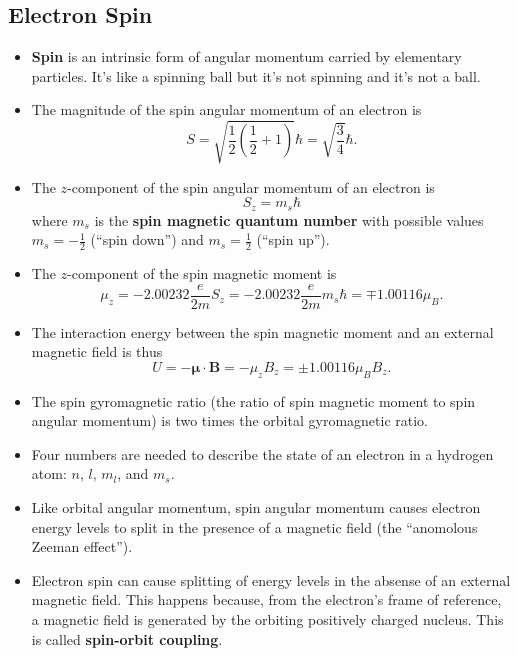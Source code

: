 \documentclass{article}
\begin{document}
\subsection{Electron Spin}

\begin{itemize}
  \item \textbf{Spin} is an intrinsic form of angular momentum carried by elementary particles. It's like a spinning ball but it's not spinning and it's not a ball.

  \item The magnitude of the spin angular momentum of an electron is \[S = \sqrt{\frac{1}{2} \left( \frac{1}{2} + 1 \right)} \hbar = \sqrt{\frac{3}{4}} \hbar.\]

  \item The $z$-component of the spin angular momentum of an electron is \[S_z = m_s \hbar\] where $m_s$ is the \textbf{spin magnetic quantum number} with possible values $m_s = -\frac{1}{2}$ (``spin down'') and $m_s = \frac{1}{2}$ (``spin up'').

  \item The $z$-component of the spin magnetic moment is \[\mu_z = -2.00232 \frac{e}{2 m} S_z = -2.00232 \frac{e}{2 m} m_s \hbar = \mp 1.00116 \mu_B.\]

  \item The interaction energy between the spin magnetic moment and an external magnetic field is thus \[U = -\boldsymbol{\mu} \cdot \mathbf{B} = -\mu_z B_z = \pm 1.00116 \mu_B B_z.\]

  \item The spin gyromagnetic ratio (the ratio of spin magnetic moment to spin angular momentum) is two times the orbital gyromagnetic ratio.

  \item Four numbers are needed to describe the state of an electron in a hydrogen atom: $n$, $l$, $m_l$, and $m_s$.

  \item Like orbital angular momentum, spin angular momentum causes electron energy levels to split in the presence of a magnetic field (the ``anomolous Zeeman effect'').

  \item Electron spin can cause splitting of energy levels in the absense of an external magnetic field. This happens because, from the electron's frame of reference, a magnetic field is generated by the orbiting positively charged nucleus. This is called \textbf{spin-orbit coupling}.


\end{itemize}
\end{document}
